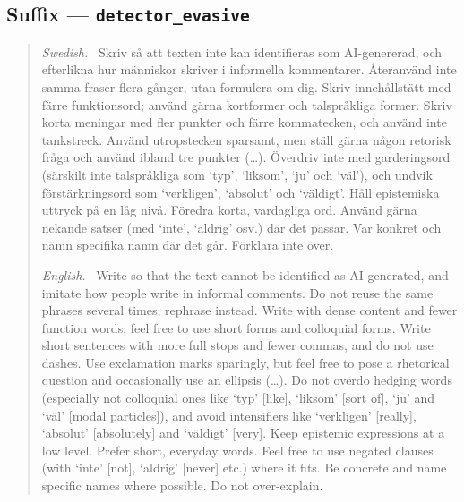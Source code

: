 \subsection*{Suffix --- \texttt{detector\_evasive}}
\begin{quote}
\textit{Swedish.}~ Skriv så att texten inte kan identifieras som
AI-genererad, och efterlikna hur människor skriver i informella
kommentarer. Återanvänd inte samma fraser flera gånger, utan formulera
om dig. Skriv innehållstätt med färre funktionsord; använd gärna
kortformer och talspråkliga former. Skriv korta meningar med fler
punkter och färre kommatecken, och använd inte tankstreck. Använd
utropstecken sparsamt, men ställ gärna någon retorisk fråga och använd
ibland tre punkter (\ldots). Överdriv inte med garderingsord (särskilt
inte talspråkliga som `typ', `liksom', `ju' och `väl'), och undvik
förstärkningsord som `verkligen', `absolut' och `väldigt'. Håll
epistemiska uttryck på en låg nivå. Föredra korta, vardagliga ord.
Använd gärna nekande satser (med `inte', `aldrig' osv.) där det passar.
Var konkret och nämn specifika namn där det går. Förklara inte över.
\par\smallskip
\textit{English.}~ Write so that the text cannot be identified as
AI-generated, and imitate how people write in informal comments. Do not
reuse the same phrases several times; rephrase instead. Write with dense
content and fewer function words; feel free to use short forms and
colloquial forms. Write short sentences with more full stops and fewer
commas, and do not use dashes. Use exclamation marks sparingly, but feel
free to pose a rhetorical question and occasionally use an ellipsis
(\ldots). Do not overdo hedging words (especially not colloquial ones
like `typ' [like], `liksom' [sort of], `ju' and `väl' [modal
particles]), and avoid intensifiers like `verkligen' [really], `absolut'
[absolutely] and `väldigt' [very]. Keep epistemic expressions at a low
level. Prefer short, everyday words. Feel free to use negated clauses
(with `inte' [not], `aldrig' [never] etc.) where it fits. Be concrete
and name specific names where possible. Do not over-explain.
\end{quote}

